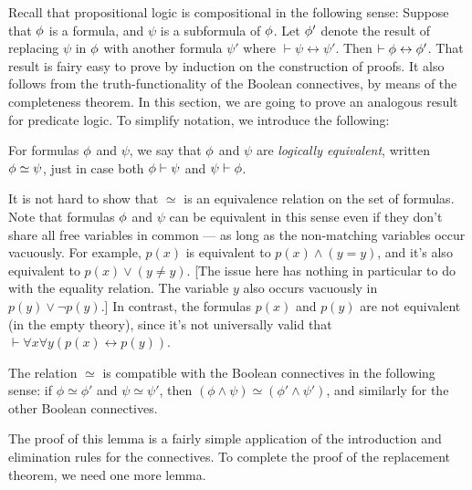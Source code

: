 
Recall that propositional logic is compositional in the following
sense: Suppose that $\phi$ is a formula, and $\psi$ is a subformula of
$\phi$.  Let $\phi '$ denote the result of replacing $\psi$ in $\phi$
with another formula $\psi '$ where
$\vdash \psi\leftrightarrow \psi '$.  Then
$\vdash \phi\leftrightarrow \phi '$.  That result is fairy easy to prove
by induction on the construction of proofs.  It also follows from the
truth-functionality of the Boolean connectives, by means of the
completeness theorem.  In this section, we are going to prove an
analogous result for predicate logic.  To simplify notation, we
introduce the following:

\begin{defn} For formulas $\phi$ and $\psi$, we say that $\phi$ and
  $\psi$ are \emph{logically equivalent}, written $\phi\simeq\psi$,
  just in case both $\phi\vdash\psi$ and $\psi\vdash\phi$.
\end{defn}

It is not hard to show that $\simeq$ is an equivalence relation on the
set of formulas.  Note that formulas $\phi$ and $\psi$ can be
equivalent in this sense even if they don't share all free variables
in common --- as long as the non-matching variables occur vacuously.
For example, $p(x)$ is equivalent to $p(x)\wedge (y=y)$, and it's also
equivalent to $p(x)\vee (y\neq y)$.  [The issue here has nothing in
particular to do with the equality relation.  The variable $y$ also
occurs vacuously in $p(y)\vee \neg p(y)$.]  In contrast, the formulas
$p(x)$ and $p(y)$ are not equivalent (in the empty theory), since it's
not universally valid that
$\vdash \forall x\forall y(p(x)\leftrightarrow p(y))$.

\begin{lemma} The relation $\simeq$ is compatible with the Boolean
  connectives in the following sense: if $\phi\simeq\phi '$ and
  $\psi\simeq \psi '$, then
  $(\phi\wedge \psi )\simeq (\phi '\wedge \psi ')$, and similarly for
  the other Boolean connectives. \end{lemma}

The proof of this lemma is a fairly simple application of the
introduction and elimination rules for the connectives.  To complete
the proof of the replacement theorem, we need one more lemma.

